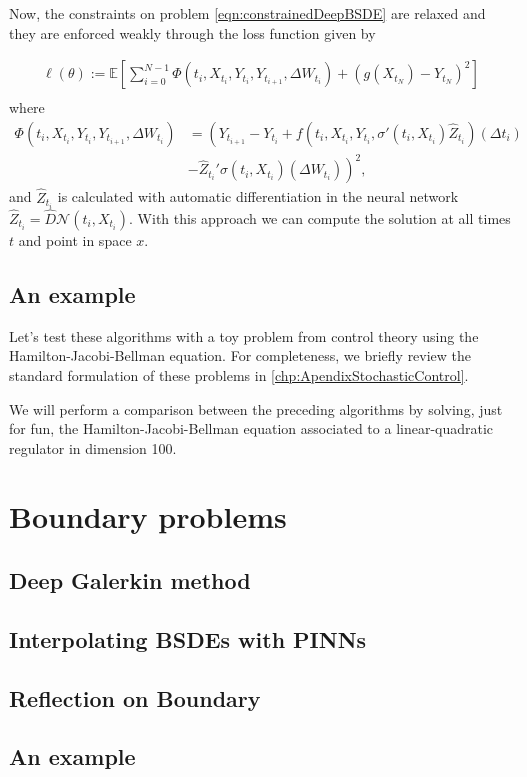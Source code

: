 Now, the constraints on problem \eqref{eqn:constrainedDeepBSDE} are relaxed and they are enforced weakly through the loss function given by

\begin{equation}
	\begin{gathered}
		\ell(\theta):=\mathbb{E}\left[\sum_{i=0}^{N-1} \Phi\left(t_i, X_{t_i}, Y_{t_i}, Y_{t_{i+1}}, \Delta W_{t_{i}}\right)+\left(g\left(X_{t_N}\right)-Y_{t_N}\right)^2\right] \\
	\end{gathered}
\end{equation}
where 
\begin{equation}
	\begin{split}
		\Phi\left(t_i, X_{t_i}, Y_{t_i}, Y_{t_{i+1}}, \Delta W_{t_i}\right)&=\left(Y_{t_{i+1}}-Y_{t_i}+f\left(t_i, X_{t_i}, Y_{t_i}, \sigma'\left(t_i, X_{t_i}\right) \widehat{Z}_{t_i}\right)\left(\Delta t_i\right)\right. \\
		&\left.-\widehat{Z}_{t_i}' \sigma\left(t_i, X_{t_i}\right)\left(\Delta W_{t_i}\right)\right)^2,
	\end{split}
\end{equation}
and $\widehat{Z}_{t_i}$ is calculated with automatic differentiation in the neural network $\widehat{Z}_{t_i}=\hat{D}\mathcal{N}(t_i,X_{t_i})$. With this approach we can compute the solution at all times $t$ and point in space $x$.
\subsection{An example}
Let's test these algorithms with a toy problem from control theory using the Hamilton-Jacobi-Bellman equation. For completeness, we briefly review the standard formulation of these problems in \autoref{chp:ApendixStochasticControl}.

We will perform a comparison between the preceding algorithms by solving, just for fun, the Hamilton-Jacobi-Bellman equation associated to a linear-quadratic regulator in dimension 100.

\section{Boundary problems}
\subsection{Deep Galerkin method}
\subsection{Interpolating BSDEs with PINNs}
\subsection{Reflection on Boundary}

\subsection{An example}